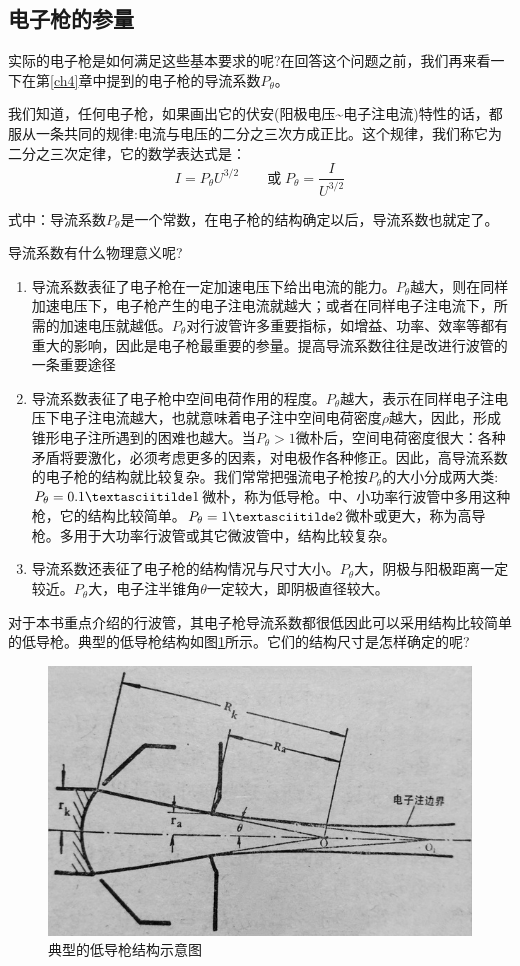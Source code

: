 \subsection{电子枪的参量}

实际的电子枪是如何满足这些基本要求的呢?在回答这个问题之前，我们再来看一下在第\ref{ch4}章中提到的电子枪的导流系数$ P_\theta $。

我们知道，任何电子枪，如果画出它的伏安(阳极电压\textasciitilde 电子注电流)特性的话，都服从一条共同的规律:电流与电压的二分之三次方成正比。这个规律，我们称它为二分之三次定律，它的数学表达式是：
\begin{equation} \label{eq:ch6-1}
	I=P_\theta U^{3/2} \qquad\textrm{或}\; P_\theta = \frac{I}{U^{3/2}}
\end{equation}

式中：导流系数$ P_\theta $是一个常数，在电子枪的结构确定以后，导流系数也就定了。

导流系数有什么物理意义呢?

\begin{enumerate}
	\item 导流系数表征了电子枪在一定加速电压下给出电流的能力。$ P_\theta $越大，则在同样加速电压下，电子枪产生的电子注电流就越大；或者在同样电子注电流下，所需的加速电压就越低。$ P_\theta $对行波管许多重要指标，如增益、功率、效率等都有重大的影响，因此是电子枪最重要的参量。提高导流系数往往是改进行波管的一条重要途径
	\item 导流系数表征了电子枪中空间电荷作用的程度。$ P_\theta $越大，表示在同样电子注电压下电子注电流越大，也就意味着电子注中空间电荷密度$ \rho $越大，因此，形成锥形电子注所遇到的困难也越大。当$ P_\theta > 1$微朴后，空间电荷密度很大：各种矛盾将要激化，必须考虑更多的因素，对电极作各种修正。因此，高导流系数的电子枪的结构就比较复杂。我们常常把强流电子枪按$ P_\theta $的大小分成两大类:$ P_\theta =0.1\textasciitilde 1$微朴，称为低导枪。中、小功率行波管中多用这种枪，它的结构比较简单。$ P_\theta =1\textasciitilde 2$微朴或更大，称为高导枪。多用于大功率行波管或其它微波管中，结构比较复杂。
	\item 导流系数还表征了电子枪的结构情况与尺寸大小。$ P_\theta $大，阴极与阳极距离一定较近。$ P_\theta $大，电子注半锥角$ \theta $一定较大，即阴极直径较大。 
\end{enumerate}

对于本书重点介绍的行波管，其电子枪导流系数都很低因此可以采用结构比较简单的低导枪。典型的低导枪结构如图\ref{ch6-7}所示。它们的结构尺寸是怎样确定的呢?

\begin{figure}[phtb]
	\centering
	\includegraphics[width=0.65\linewidth]{figure/ch6-7}
	\caption{典型的低导枪结构示意图}
	\label{ch6-7}
\end{figure}


